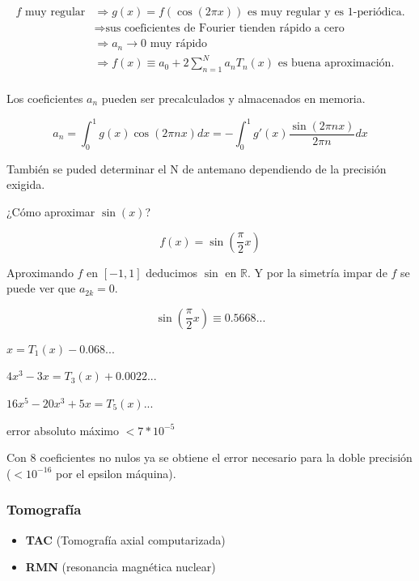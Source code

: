 		$$
		\begin{aligned}
		f \text{ muy regular} & \Rightarrow g(x) = f(\cos (2 \pi x))\text{ es muy regular y es 1-periódica.} \\
		& \Rightarrow \text{sus coeficientes de Fourier tienden rápido a cero} \\
		& \Rightarrow a_n \rightarrow 0 \text{ muy rápido} \\
		& \Rightarrow f(x) \equiv a_0 + 2 \sum\limits^{N}_{n=1} a_n T_n (x) \text{ es buena aproximación.} \\
		\end{aligned}
		$$

		\begin{obs}
			Los coeficientes $a_n$ pueden ser precalculados y almacenados en memoria.

			$$ a_n = \int^{1}_{0} g(x) \cos (2 \pi n x) dx = - \int^{1}_{0} g'(x) \frac{\sin (2 \pi n x)}{2 \pi n} dx $$

			También se puded determinar el N de antemano dependiendo de la precisión exigida.
		\end{obs}


		\begin{example}{¿Cómo aproximar $\sin (x)$?}

			$$f(x) = \sin(\frac{\pi}{2} x) $$

			Aproximando $f$ en $[-1,1]$ deducimos $\sin$ en $\mathbb{R}$. Y por la simetría impar de $f$ se puede ver que $a_{2k} = 0$.

			$$\sin (\frac{\pi}{2} x) \equiv 0.5668...$$

			$x = T_1 (x) - 0.068 ...$

			$4x^3 - 3x = T_3 (x) + 0.0022 ...$

			$16x^5 - 20x^3 + 5x = T_5(x) ... $

			error absoluto máximo $< 7 * 10^{-5}$

			Con 8 coeficientes no nulos ya se obtiene el error necesario para la doble precisión ($ < 10^{-16}$ por el epsilon máquina).


		\end{example}

\subsubsection{Tomografía}
\begin{itemize}
	\item \textbf{TAC} (Tomografía axial computarizada)
	\item \textbf{RMN} (resonancia magnética nuclear)
\end{itemize}
	
